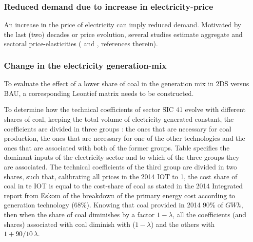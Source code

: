 \documentclass[12pt,english]{article}
\begin{document}
\subsubsection{Reduced demand due to increase in electricity-price}

An increase in the price of electricity can imply reduced demand. Motivated by the last (two) decades or price evolution, several studies estimate aggregate and sectoral price-elasticities (\cite{inglesi2010forecasting} and \cite{goliger2018electricity}, references therein). 


\subsubsection{Change in the electricity generation-mix}


To evaluate the effect of a lower share of coal in the generation mix in 2DS versus BAU, a corresponding Leontief matrix needs to be constructed. 

To determine how the technical coefficients of sector SIC 41 evolve with different shares of coal, keeping the total volume of electricity generated constant, the coefficients are divided in three groups : the ones that are necessary for coal production, the ones that are necessary for one of the other technologies and the ones that are associated with both of the former groups. %
Table \label{GenerationMixcoefficients} specifies the dominant inputs of the electricity sector and to which of the three groups they are associated. The technical coefficients of the third group are divided in two shares, such that, calibrating all prices in the 2014 IOT to 1, the cost share of coal in te IOT is equal to the cost-share of coal as stated in the 2014 Integrated report from Eskom of the breakdown of the primary energy cost according to generation technology (68\%). Knowing that coal provided in 2014 90\% of $GWh$, then when the share of coal diminishes by a factor $1 - \lambda$, all the coefficients (and shares) associated with coal diminish with ($1-\lambda$) and the others with $1 + 90/10 \, \lambda$.
\end{document}
